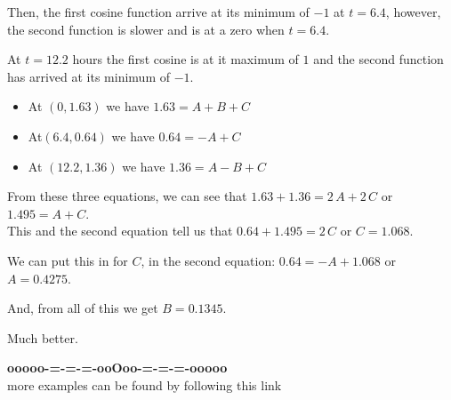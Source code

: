 \documentclass{ximera}
\begin{document}
Then, the first cosine function arrive at its minimum of $-1$ at $t=6.4$, however, the second function is slower and is at a zero when $t=6.4$.  

At $t=12.2$ hours the first cosine is at it maximum of $1$ and the second function has arrived at its minimum of $-1$.






\begin{itemize}
\item At $(0, 1.63)$  we have $1.63 = A + B + C$
\item At$(6.4, 0.64)$ we have $0.64 = -A + C$
\item At $(12.2, 1.36)$  we have $1.36 = A - B + C$
\end{itemize}




From these three equations, we can see that $1.63 + 1.36 = 2 \, A + 2 \, C$   or $1.495 = A + C$.  \\

This and the second equation tell us that $0.64 + 1.495 = 2 \, C$ or $C = 1.068$. 

We can put this in for $C$, in the second equation: $0.64 = -A + 1.068$ or $A = 0.4275$.

And, from all of this we get $B = 0.1345$.






\begin{center}
\end{center}

Much better.



















\begin{onlineOnly}
\begin{center}
\textbf{\textcolor{green!50!black}{ooooo-=-=-=-ooOoo-=-=-=-ooooo}} \\

more examples can be found by following this link\\ 

\end{center}
\end{onlineOnly}
\end{document}
